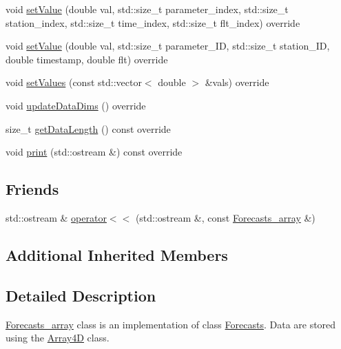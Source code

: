 \begin{DoxyCompactItemize}
\item 
void \mbox{\hyperlink{class_forecasts__array_a19d59c93e8b7692ebae2d3e15dc43f87}{set\+Value}} (double val, std\+::size\+\_\+t parameter\+\_\+index, std\+::size\+\_\+t station\+\_\+index, std\+::size\+\_\+t time\+\_\+index, std\+::size\+\_\+t flt\+\_\+index) override
\item 
void \mbox{\hyperlink{class_forecasts__array_a7224d8333630fcd162a1b69b49241d2f}{set\+Value}} (double val, std\+::size\+\_\+t parameter\+\_\+\+ID, std\+::size\+\_\+t station\+\_\+\+ID, double timestamp, double flt) override
\item 
void \mbox{\hyperlink{class_forecasts__array_af31e7741f2e048593cbec1c317210b65}{set\+Values}} (const std\+::vector$<$ double $>$ \&vals) override
\item 
void \mbox{\hyperlink{class_forecasts__array_ab3fc780bb6a5cbf132457c8c336bc777}{update\+Data\+Dims}} () override
\item 
size\+\_\+t \mbox{\hyperlink{class_forecasts__array_aae8790581dc2f2dcfc140c34999588e0}{get\+Data\+Length}} () const override
\item 
void \mbox{\hyperlink{class_forecasts__array_a56985347f516340034b29dc4cdda87b1}{print}} (std\+::ostream \&) const override
\end{DoxyCompactItemize}
\subsection*{Friends}
\begin{DoxyCompactItemize}
\item 
std\+::ostream \& \mbox{\hyperlink{class_forecasts__array_a6bde933a6e00ad1328f834e4f5d98606}{operator$<$$<$}} (std\+::ostream \&, const \mbox{\hyperlink{class_forecasts__array}{Forecasts\+\_\+array}} \&)
\end{DoxyCompactItemize}
\subsection*{Additional Inherited Members}


\subsection{Detailed Description}
\mbox{\hyperlink{class_forecasts__array}{Forecasts\+\_\+array}} class is an implementation of class \mbox{\hyperlink{class_forecasts}{Forecasts}}. Data are stored using the \mbox{\hyperlink{class_array4_d}{Array4D}} class. 

